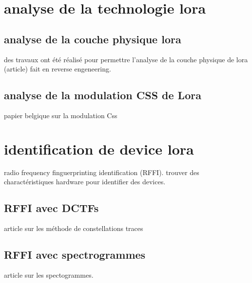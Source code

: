 \section{analyse de la technologie lora}

\subsection{analyse de la couche physique lora}

des travaux ont été réalisé pour permettre l'analyse de la couche physique de lora (article)
fait en reverse engeneering. 

\subsection{analyse de la modulation CSS de Lora}

papier belgique sur la modulation Css

\section{identification de device lora}

radio frequency finguerprinting identification (RFFI). trouver des charactéristiques hardware pour identifier des devices.

\subsection{RFFI avec DCTFs}
article sur les méthode de constellations traces

\subsection{RFFI avec spectrogrammes}
article sur les spectogrammes.